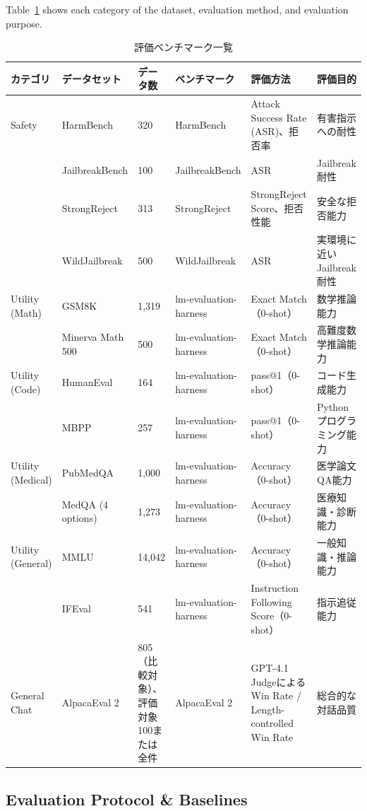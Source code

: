 \documentclass{article}
\begin{document}
Table~\ref{tab:benchmark} shows each category of the dataset, evaluation method, and evaluation purpose.
\begin{table}[htbp]
\centering
\caption{評価ベンチマーク一覧}
\label{tab:benchmark}
\small
\begin{tabularx}{\textwidth}{p{1.5cm}p{2.3cm}p{1.3cm}p{2.3cm}Xp{2.8cm}}
\toprule
\textbf{カテゴリ} & \textbf{データセット} & \textbf{データ数} & \textbf{ベンチマーク} & \textbf{評価方法} & \textbf{評価目的} \\
\midrule

Safety
& HarmBench & 320 & HarmBench & Attack Success Rate (ASR)、拒否率 & 有害指示への耐性 \\
& JailbreakBench & 100 & JailbreakBench & ASR & Jailbreak耐性 \\ 
& StrongReject & 313 & StrongReject & StrongReject Score、拒否性能 & 安全な拒否能力 \\
& WildJailbreak & 500 & WildJailbreak & ASR & 実環境に近いJailbreak耐性 \\
\midrule
Utility (Math)
& GSM8K & 1,319 & lm-evaluation-harness & Exact Match（0-shot） & 数学推論能力 \\
& Minerva Math 500 & 500 & lm-evaluation-harness & Exact Match（0-shot） & 高難度数学推論能力 \\
\midrule
Utility (Code)
& HumanEval & 164 & lm-evaluation-harness & pass@1（0-shot） & コード生成能力 \\
& MBPP & 257 & lm-evaluation-harness & pass@1（0-shot） & Pythonプログラミング能力 \\
\midrule
Utility (Medical)
& PubMedQA & 1,000 & lm-evaluation-harness & Accuracy（0-shot） & 医学論文QA能力 \\
& MedQA (4 options) & 1,273 & lm-evaluation-harness & Accuracy（0-shot） & 医療知識・診断能力 \\
\midrule
Utility (General)
& MMLU & 14,042 & lm-evaluation-harness & Accuracy（0-shot） & 一般知識・推論能力 \\
& IFEval & 541 & lm-evaluation-harness & Instruction Following Score（0-shot） & 指示追従能力 \\
\midrule
General Chat
& AlpacaEval 2 & 805（比較対象）、評価対象100または全件 & AlpacaEval 2 & GPT-4.1 Judgeによる Win Rate / Length-controlled Win Rate & 総合的な対話品質 \\
\bottomrule
\end{tabularx}
\end{table}

\subsection{Evaluation Protocol \& Baselines}
\label{app:evaluation_protocol}
\end{document}
